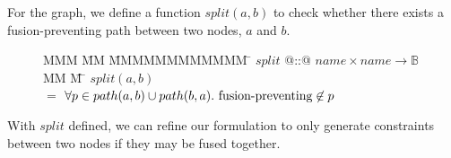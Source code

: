 For the graph, we define a function $split(a,b)$ to check whether there exists a fusion-preventing path between two nodes, $a$ and $b$.

\begin{figure}[H]
\begin{tabbing}
MMM      \= MM   \=  MMMMMMMMMMMM    \=  \kill
$split$     \> @::@ \> $name \times name \to \mathbb{B}$      \\
MM        \= M    \= \kill
$split(a,b)$ \\
    \>$=$  \>$\forall p \in path(a,b) \cup path(b,a).\ \fusionpreventing \not\in p$\\
\end{tabbing}
\end{figure}

With $split$ defined, we can refine our formulation to only generate constraints between two nodes if they may be fused together.

